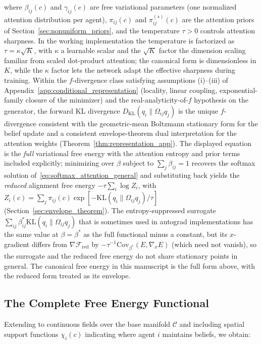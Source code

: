 \documentclass[11pt]{article}
\begin{document}
where $\beta_{ij}(c)$ and $\gamma_{ij}(c)$ are free variational parameters (one normalized attention distribution per agent), $\pi_{ij}(c)$ and $\pi^{(s)}_{ij}(c)$ are the attention priors of Section~\ref{sec:nonuniform_priors}, and the temperature $\tau > 0$ controls attention sharpness. In the working implementation the temperature is factorized as $\tau = \kappa\sqrt{K}$, with $\kappa$ a learnable scalar and the $\sqrt{K}$ factor the dimension scaling familiar from scaled dot-product attention; the canonical form is dimensionless in $K$, while the $\kappa$ factor lets the network adapt the effective sharpness during training. Within the $f$-divergence class satisfying assumptions (i)--(iii) of Appendix~\ref{app:conditional_representation} (locality, linear coupling, exponential-family closure of the minimizer) and the real-analyticity-of-$f$ hypothesis on the generator, the forward KL divergence $D_{\mathrm{KL}}(q_i \| \Omega_{ij}q_j)$ is the unique $f$-divergence consistent with the geometric-mean Boltzmann stationary form for the belief update and a consistent envelope-theorem dual interpretation for the attention weights (Theorem~\ref{thm:representation_app}). The displayed equation is the \emph{full} variational free energy with the attention entropy and prior terms included explicitly; minimizing over $\beta$ subject to $\sum_j \beta_{ij} = 1$ recovers the softmax solution of~\eqref{eq:softmax_attention_general} and substituting back yields the \emph{reduced} alignment free energy $-\tau \sum_i \log Z_i$, with $Z_i(c) = \sum_j \pi_{ij}(c)\exp[-\mathrm{KL}(q_i \| \Omega_{ij}q_j)/\tau]$ (Section~\ref{sec:envelope_theorem}). The entropy-suppressed surrogate $\sum_{ij} \beta^*_{ij}\mathrm{KL}(q_i \| \Omega_{ij}q_j)$ that is sometimes used in autograd implementations has the same value at $\beta = \beta^*$ as the full functional minus a constant, but its $x$-gradient differs from $\nabla \mathcal{F}_{\mathrm{red}}$ by $-\tau^{-1}\mathrm{Cov}_{\beta^*}(E, \nabla_x E)$ (which need not vanish), so the surrogate and the reduced free energy do not share stationary points in general. The canonical free energy in this manuscript is the full form above, with the reduced form treated as its envelope.

\subsection{The Complete Free Energy Functional}
\label{sec:complete_free_energy}

Extending to continuous fields over the base manifold $\mathcal{C}$ and including spatial support functions $\chi_i(c)$ indicating where agent $i$ maintains beliefs, we obtain:
\end{document}
